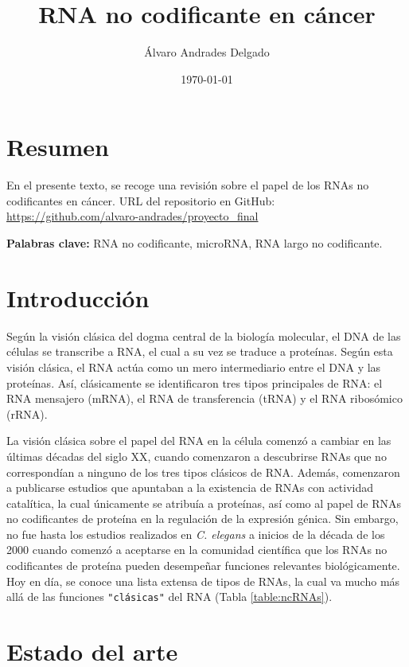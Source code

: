 \documentclass[a4paper,11pt]{article}
\begin{document}
\title{RNA no codificante en cáncer}
\author{Álvaro Andrades Delgado}
\date{\today}
\maketitle

\section{Resumen}

En el presente texto, se recoge una revisión sobre el papel de los RNAs no codificantes en cáncer. URL del repositorio en GitHub: \url{https://github.com/alvaro-andrades/proyecto_final} 

\textbf{Palabras clave:} RNA no codificante, microRNA, RNA largo no codificante.


\section{Introducción}

Según la visión clásica del dogma central de la biología molecular, el DNA de las células se transcribe a RNA, el cual a su vez se traduce a proteínas\cite{Kung2013}. Según esta visión clásica, el RNA actúa como un mero intermediario entre el DNA y las proteínas. Así, clásicamente se identificaron tres tipos principales de RNA: el RNA mensajero (mRNA), el RNA de transferencia (tRNA) y el RNA ribosómico (rRNA)\cite{Cech2014}.

La visión clásica sobre el papel del RNA en la célula comenzó a cambiar en las últimas décadas del siglo XX, cuando comenzaron a descubrirse RNAs que no correspondían a ninguno de los tres tipos clásicos de RNA\cite{Cech2014}. Además, comenzaron a publicarse estudios que apuntaban a la existencia de RNAs con actividad catalítica, la cual únicamente se atribuía a proteínas\cite{Kruger1982}, así como al papel de RNAs no codificantes de proteína en la regulación de la expresión génica\cite{Brannan1990}. Sin embargo, no fue hasta los estudios realizados en \textit{C. elegans} a inicios de la década de los 2000 cuando comenzó a aceptarse en la comunidad científica que los RNAs no codificantes de proteína pueden desempeñar funciones relevantes biológicamente\cite{Grishok2001}. Hoy en día, se conoce una lista extensa de tipos de RNAs, la cual va mucho más allá de las funciones \verb="clásicas"= del RNA (Tabla \ref{table:ncRNAs}).


\section{Estado del arte}
\end{document}
